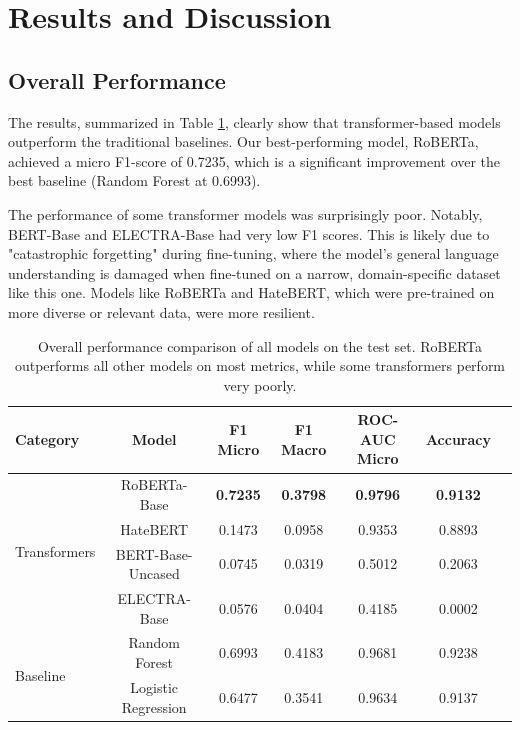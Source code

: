 \documentclass[11pt]{article}
\begin{document}
\section{Results and Discussion}

\subsection{Overall Performance}

The results, summarized in Table \ref{tab:results_detailed}, clearly show that transformer-based models outperform the traditional baselines. Our best-performing model, RoBERTa, achieved a micro F1-score of 0.7235, which is a significant improvement over the best baseline (Random Forest at 0.6993).

The performance of some transformer models was surprisingly poor. Notably, BERT-Base and ELECTRA-Base had very low F1 scores. This is likely due to "catastrophic forgetting" during fine-tuning, where the model's general language understanding is damaged when fine-tuned on a narrow, domain-specific dataset like this one. Models like RoBERTa and HateBERT, which were pre-trained on more diverse or relevant data, were more resilient.

\begin{table}[ht]
\centering
\small
\begin{tabular}{lcccccc}
\toprule
\textbf{Category} & \textbf{Model} & \textbf{F1 Micro} & \textbf{F1 Macro} & \textbf{ROC-AUC Micro} & \textbf{Accuracy} \\
\midrule
\multirow{4}{*}{Transformers} & RoBERTa-Base & \textbf{0.7235} & \textbf{0.3798} & \textbf{0.9796} & \textbf{0.9132} \\
& HateBERT & 0.1473 & 0.0958 & 0.9353 & 0.8893 \\
& BERT-Base-Uncased & 0.0745 & 0.0319 & 0.5012 & 0.2063 \\
& ELECTRA-Base & 0.0576 & 0.0404 & 0.4185 & 0.0002 \\
\midrule
\multirow{2}{*}{Baseline} & Random Forest & 0.6993 & 0.4183 & 0.9681 & 0.9238 \\
& Logistic Regression & 0.6477 & 0.3541 & 0.9634 & 0.9137 \\
\bottomrule
\end{tabular}
\caption{Overall performance comparison of all models on the test set. RoBERTa outperforms all other models on most metrics, while some transformers perform very poorly.}
\label{tab:results_detailed}
\end{table}
\end{document}
